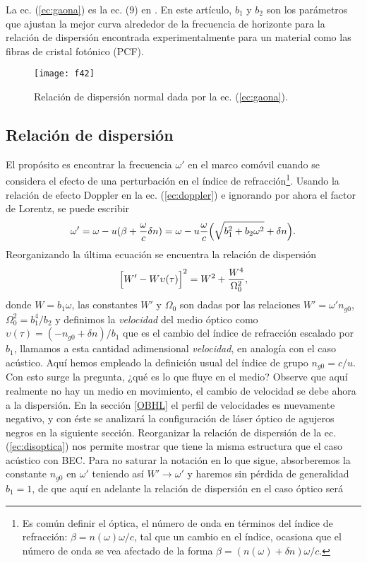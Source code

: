 La ec. (\ref{ec:gaona}) es la ec. ($9$) en \cite{GaonaReyes2017}. En este art\'{i}culo, $b_1$ y $b_2$ son los par\'{a}metros que ajustan la mejor curva alrededor de la frecuencia de horizonte para la relaci\'{o}n de dispersi\'{o}n encontrada experimentalmente para un material como las fibras de cristal fot\'{o}nico (PCF).\\
\begin{figure}\centering
	\texttt{[image: f42]}
	\caption{Relaci\'{o}n de dispersi\'{o}n normal dada por la ec. (\ref{ec:gaona}).}\label{fig:labdis}
\end{figure}
\subsection{Relaci\'{o}n de dispersi\'{o}n}\label{normaneg}
El prop\'{o}sito es encontrar la frecuencia $\omega'$ en el marco com\'{o}vil cuando se considera el efecto de una perturbaci\'{o}n en el \'{i}ndice de refracci\'{o}n\footnote{Es com\'{u}n definir el \'{o}ptica, el n\'{u}mero de onda en t\'{e}rminos del \'{i}ndice de refracci\'{o}n: $\beta=n(\omega)\omega/c$, tal que un cambio en el \'{i}ndice, ocasiona que el n\'{u}mero de onda se vea afectado de la forma  $\beta=(n(\omega)+\delta n)\omega/c$.}. Usando la relaci\'{o}n de efecto Doppler en la ec. (\ref{ec:doppler}) e ignorando por ahora el factor de Lorentz, se puede escribir 
\begin{align}
\omega'=\omega-u(\beta+\frac{\omega}{c}\delta n)
=\omega-u\frac{\omega}{c}\Bigl(\sqrt{b_1^2+b_2\omega^2}+\delta n\Bigr).
\end{align}
Reorganizando la \'{u}ltima ecuaci\'{o}n se encuentra la relaci\'{o}n de dispersi\'{o}n
\begin{equation}\label{ec:disoptica}
\Bigl[W'-W\upsilon(\tau)\Bigr]^2=W^2+\frac{W^4}{\Omega_0^2},
\end{equation}
donde $W=b_1\omega$, las constantes $W'$ y $\Omega_0$ son dadas por las relaciones $W'=\omega'n_{g0}$, $\Omega^2_0=b_1^4/b_2$ y definimos la \textit{velocidad} del medio  \'{o}ptico como $\upsilon(\tau)=(-n_{g0}+\delta n)/b_1$ que es el cambio del \'{i}ndice de refracci\'{o}n escalado por $b_1$, llamamos a esta cantidad adimensional \textit{velocidad}, en analog\'{i}a con el caso ac\'{u}stico. Aqu\'{i} hemos empleado la definici\'{o}n usual del \'{i}ndice de grupo $n_{g0}=c/u$. Con esto surge la pregunta, ¿qu\'{e} es lo que fluye en el medio? Observe que aqu\'{i} realmente no hay un medio en movimiento, el cambio de velocidad se debe ahora a la dispersi\'{o}n. En la secci\'{o}n \ref{OBHL} el perfil de velocidades es nuevamente  negativo, y con \'{e}ste se analizar\'{a} la configuraci\'{o}n de l\'{a}ser \'{o}ptico de agujeros negros en la siguiente secci\'{o}n. Reorganizar la relaci\'{o}n de dispersi\'{o}n de la ec. (\ref{ec:disoptica}) nos permite mostrar que tiene la misma estructura que el caso ac\'{u}stico con BEC. Para no saturar la notaci\'{o}n en lo que sigue, absorberemos la constante $n_{g0}$ en $\omega'$ teniendo as\'{i} $W'\rightarrow\omega'$ y haremos sin p\'{e}rdida de generalidad $b_1=1$, de que aqu\'{i} en adelante la relaci\'{o}n de dispersi\'{o}n en el caso \'{o}ptico ser\'{a}
